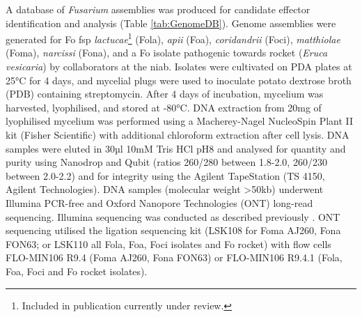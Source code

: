 A database of \textit{Fusarium} assemblies was produced for candidate effector identification and analysis (Table \ref{tab:GenomeDB}). Genome assemblies were generated for \ac{Fo} \ac{fsp} \textit{lactucae}\footnote{\label{note1}Included in publication currently under review.} (\acs{Fola}), \textit{apii} (\acs{Foa}), \textit{coridandrii} (\acs{Foci}), \textit{matthiolae} (\acs{Foma}), \textit{narcissi} (\acs{Fona}), and a \ac{Fo} isolate pathogenic towards rocket (\textit{Eruca vesicaria}) by collaborators at the \ac{niab}. Isolates were cultivated on PDA plates at 25°C for 4 days, and mycelial plugs were used to inoculate potato dextrose broth (PDB) containing streptomycin. After 4 days of incubation, mycelium was harvested, lyophilised, and stored at -80°C. DNA extraction from 20mg of lyophilised mycelium was performed using a Macherey-Nagel NucleoSpin Plant II kit (Fisher Scientific) with additional chloroform extraction after cell lysis. DNA samples were eluted in 30µl 10mM Tris HCl pH8 and analysed for quantity and purity using Nanodrop and Qubit (ratios 260/280 between 1.8-2.0, 260/230 between 2.0-2.2)  and for integrity using the Agilent TapeStation (TS 4150, Agilent Technologies). DNA samples (molecular weight >50kb) underwent Illumina PCR-free and Oxford Nanopore Technologies (ONT) long-read sequencing. Illumina sequencing was conducted as described previously \parencite{Armitage2018}. ONT sequencing utilised the ligation sequencing kit (LSK108 for \ac{Foma} AJ260, \ac{Fona} FON63; or LSK110 all \ac{Fola}, \ac{Foa}, \ac{Foci} isolates and \ac{Fo} rocket) with flow cells FLO-MIN106 R9.4 (\ac{Foma} AJ260, \ac{Fona} FON63) or FLO-MIN106 R9.4.1 (\ac{Fola}, \ac{Foa}, \ac{Foci} and \ac{Fo} rocket isolates). 

